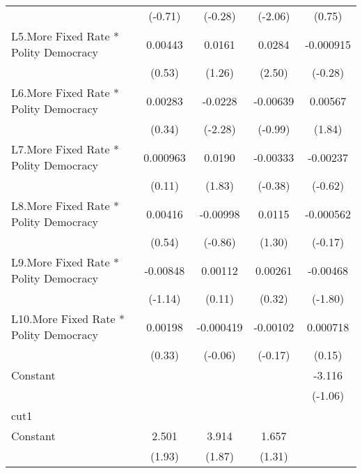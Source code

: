 {\begin{longtable}{l*{4}{c}}
                &  (-0.71)         &  (-0.28)         &  (-2.06)         &   (0.75)         \\
\addlinespace
L5.More Fixed Rate * Polity Democracy&  0.00443         &   0.0161         &   0.0284\sym{*}  &-0.000915         \\
                &   (0.53)         &   (1.26)         &   (2.50)         &  (-0.28)         \\
\addlinespace
L6.More Fixed Rate * Polity Democracy&  0.00283         &  -0.0228\sym{*}  & -0.00639         &  0.00567         \\
                &   (0.34)         &  (-2.28)         &  (-0.99)         &   (1.84)         \\
\addlinespace
L7.More Fixed Rate * Polity Democracy& 0.000963         &   0.0190         & -0.00333         & -0.00237         \\
                &   (0.11)         &   (1.83)         &  (-0.38)         &  (-0.62)         \\
\addlinespace
L8.More Fixed Rate * Polity Democracy&  0.00416         & -0.00998         &   0.0115         &-0.000562         \\
                &   (0.54)         &  (-0.86)         &   (1.30)         &  (-0.17)         \\
\addlinespace
L9.More Fixed Rate * Polity Democracy& -0.00848         &  0.00112         &  0.00261         & -0.00468         \\
                &  (-1.14)         &   (0.11)         &   (0.32)         &  (-1.80)         \\
\addlinespace
L10.More Fixed Rate * Polity Democracy&  0.00198         &-0.000419         & -0.00102         & 0.000718         \\
                &   (0.33)         &  (-0.06)         &  (-0.17)         &   (0.15)         \\
\addlinespace
Constant        &                  &                  &                  &   -3.116         \\
                &                  &                  &                  &  (-1.06)         \\
\midrule
cut1            &                  &                  &                  &                  \\
Constant        &    2.501         &    3.914         &    1.657         &                  \\
                &   (1.93)         &   (1.87)         &   (1.31)         &                  \\

\end{longtable}}
